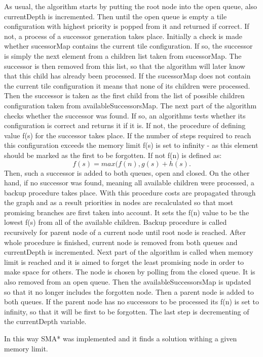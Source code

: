 \documentclass[12pt]{article}
\begin{document}
As usual, the algorithm starts by putting the root node into the open queue, also currentDepth is incremented. Then until the open queue is empty a tile configuration with highest priority is popped from it and returned if correct. If not, a process of a successor generation takes place. Initially a check is made whether sucessorMap contains the current tile configuration. If so, the successor is simply the next element from a children list taken from sucessorMap. The successor is then removed from this list, so that the algorithm will later know that this child has already been processed. If the sucessorMap does not contain the current tile configuration it means that none of its children were processed. Then the successor is taken as the first child from the list of possible children configuration taken from availableSuccessorsMap. 
The next part of the algorithm checks whether the successor was found. If so, an algorithms tests whether its configuration is correct and returns it if it is. If not, the procedure of defining value f(s) for the successor takes place. If the number of steps required to reach this configuration exceeds the memory limit f(s) is set to infinity - as this element should be marked as the first to be forgotten. If not f(n) is defined as:
\[
f(s) = max(f(n), g(s) + h(s).
\]
Then, such a successor is added to both queues, open and closed. 
On the other hand, if no successor was found, meaning all available children were processed, a backup procedure takes place. With this procedure costs are propagated through the graph and as a result priorities in nodes are recalculated so that most promising branches are first taken into account. It sets the f(n) value to be the lowest f(s) from all of the available children. Backup procedure is called recursively for parent node of a current node until root node is reached. After whole procedure is finished, current node is removed from both queues and currentDepth is incremented. 
Next part of the algorithm is called when memory limit is reached and it is aimed to forget the least promising node in order to make space for others. The node is chosen by polling from the closed queue. It is also removed from an open queue. Then the availableSuccessorsMap is updated so that it no longer includes the forgotten node. Then a parent node is added to both queues. If the parent node has no successors to be processed its f(n) is set to infinity, so that it will be first to be forgotten. The last step is decrementing of the currentDepth variable.  

In this way SMA* was implemented and it finds a solution withing a given memory limit. 
\end{document}
